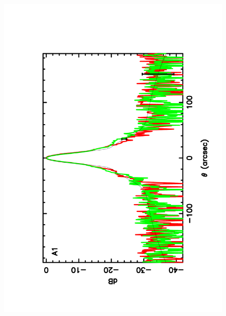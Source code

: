 \begin{figure}
\begin{center}
\includegraphics[clip, angle=-90, scale =0.3]{Figures/Array_A1_dB.pdf}

\end{center}
\end{figure}
